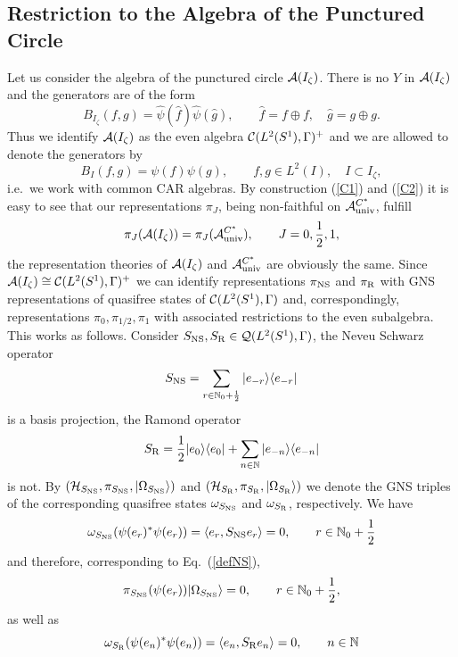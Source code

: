 \documentclass[10pt,a4paper]{article}
\begin{document}
\subsection{Restriction to the Algebra of the
Punctured Circle}
Let us consider the algebra of the punctured
circle ${\cal A}(I_\zeta)$. There is no $Y$
in ${\cal A}(I_\zeta)$ and the generators
are of the form
\[ B_{I_\zeta}(f,g) = \hat{\psi}(\hat{f})
\hat{\psi}(\hat{g}), \qquad \hat{f}=f\oplus f,
\quad \hat{g}=g\oplus g. \]
Thus we identify ${\cal A}(I_\zeta)$ as the even
algebra ${\cal C}(L^2(S^1),\Gamma)^+$ and we are
allowed to denote the generators by
\[ B_I(f,g)=\psi(f)\psi(g),\qquad f,g\in L^2(I),
\quad I\subset I_\zeta, \]
i.e.~we work with common CAR algebras. By
construction (\ref{C1}) and (\ref{C2}) it is easy to
see that our representations $\pi_J$, being
non-faithful on ${\cal A}_{\rm univ}^{C^*}$,
fulfill
\[ \pi_J({\cal A}(I_\zeta))=
\pi_J({\cal A}_{\rm univ}^{C^*}),\qquad J=0,
\frac{1}{2},1, \]
the representation theories of ${\cal A}(I_\zeta)$
and ${\cal A}_{\rm univ}^{C^*}$ are obviously the
same. Since ${\cal A}(I_\zeta)\cong
{\cal C}(L^2(S^1),\Gamma)^+$ we can identify
representations $\pi_{\rm NS}$ and $\pi_{\rm R}$ with
GNS representations of quasifree states of
${\cal C}(L^2(S^1),\Gamma)$ and, correspondingly,
representations $\pi_0,\pi_{1/2},\pi_1$
with associated restrictions to the even
subalgebra. This works as follows. Consider
$S_{\rm NS},S_{\rm R}\in{\cal Q}(L^2(S^1),\Gamma)$, the
Neveu Schwarz operator
\begin{equation}
S_{\rm NS}=\sum_{r\in \mathbb{N}_0+\frac{1}{2}} |e_{-r}
\rangle \langle e_{-r} |
\end{equation}
is a basis projection, the Ramond operator
\begin{equation}
S_{\rm R}=\frac{1}{2} |e_0\rangle\langle e_0| +
\sum_{n\in \mathbb{N}} |e_{-n} \rangle\langle e_{-n}|
\end{equation}
is not. By
$({\cal H}_{S_{\rm NS}},\pi_{S_{\rm NS}},|\Omega_{S_{\rm NS}}\rangle)$
and $({\cal H}_{S_{\rm R}},\pi_{S_{\rm R}},|\Omega_{S_{\rm R}}\rangle)$
we denote the GNS triples of the corresponding
quasifree states $\omega_{S_{\rm NS}}$ and $\omega_{S_{\rm R}}$,
respectively. We have
\[ \omega_{S_{\rm NS}} (\psi(e_r)^*\psi(e_r)) =
\langle e_r, S_{\rm NS} e_r \rangle = 0, \qquad r \in
\mathbb{N}_0+\frac{1}{2} \]
and therefore, corresponding to Eq.~(\ref{defNS}),
\[ \pi_{S_{\rm NS}}(\psi(e_r))|\Omega_{S_{\rm NS}} \rangle =0,
\qquad r \in \mathbb{N}_0 + \frac{1}{2}, \]
as well as
\[ \omega_{S_{\rm R}} (\psi(e_n)^*\psi(e_n)) = \langle e_n,
S_{\rm R} e_n \rangle =0, \qquad n \in \mathbb{N} \]
\end{document}

